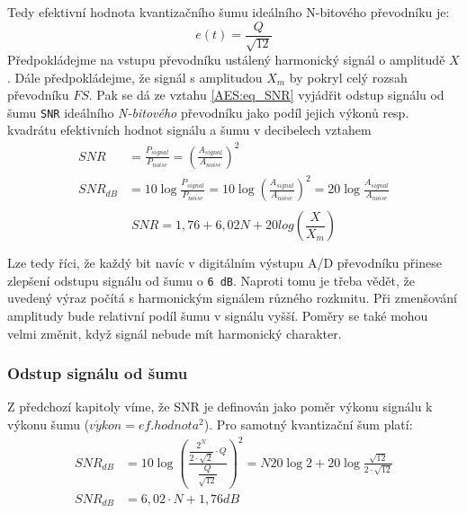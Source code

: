         Tedy efektivní hodnota kvantizačního šumu ideálního N-bitového převodníku je:
        \begin{equation}\label{AES:eq_ef_kv_sumu}
            e(t) = \frac{Q}{\sqrt{12}}
        \end{equation}
        Předpokládejme na vstupu převodníku ustálený harmonický signál o amplitudě $X$. Dále předpokládejme, že signál s amplitudou $X_m$ by pokryl celý rozsah 
        převodníku $FS$. Pak se dá ze vztahu \ref{AES:eq_SNR} vyjádřit odstup signálu od šumu \texttt{SNR} ideálního \emph{N-bitového} převodníku jako podíl 
        jejich výkonů resp. kvadrátu efektivních hodnot signálu a šumu v decibelech vztahem
        \begin{align}
          SNR      &= \frac{P_{signal}}{P_{noise}} = \left(\frac{A_{signal}}{A_{noise}}\right)^2         \\
          SNR_{dB} &= 10\log\frac{P_{signal}}{P_{noise}} = 10\log\left(\frac{A_{signal}}{A_{noise}}\right)^2 = 20\log\frac{A_{signal}}{A_{noise}} \\
        \end{align}
        \begin{equation}\label{AES:eq_SNR_N}
            SNR  = 1,76 + 6,02N + 20log\left(\frac{X}{X_m}\right)
        \end{equation}

        Lze tedy říci, že každý bit navíc v digitálním výstupu A/D převodníku přinese zlepšení odstupu signálu od šumu o \texttt{6 dB}. Naproti tomu je třeba vědět, že uvedený výraz počítá s harmonickým signálem různého rozkmitu. Při zmenšování amplitudy bude relativní podíl šumu v signálu vyšší. Poměry se také mohou velmi změnit, když signál nebude mít harmonický charakter.

      \subsubsection{Odstup signálu od šumu}\label{AES:cap_SNR}
        Z předchozí kapitoly víme, že SNR je definován jako poměr výkonu signálu k výkonu šumu ($v\acute{y}kon = ef. hodnota^2$). Pro samotný kvantizační šum platí:
        \begin{align}
          SNR_{dB} &= 10\log\left(\frac{\dfrac{2^N}{2\cdot\sqrt{2}}\cdot Q}{\dfrac{Q}{\sqrt{12}}}\right)^2 = N20\log2 + 20\log\frac{\sqrt{12}}{2\cdot\sqrt{12}} \\ \nonumber
          SNR_{dB} &= 6,02\cdot N + 1,76dB
        \end{align}

